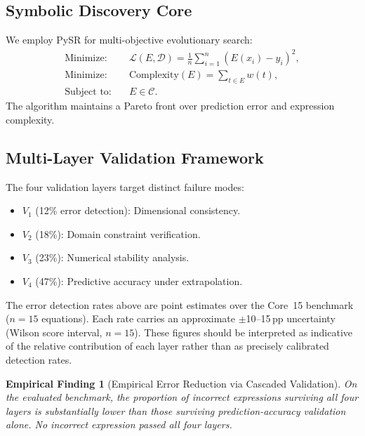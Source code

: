 \documentclass[twoside,11pt]{article}
\newtheorem{finding}{Empirical Finding}
\begin{document}
\subsection{Symbolic Discovery Core}\label{subsec:symbolic-discovery-core}
\label{sec:arch_discovery}

We employ PySR \citep{cranmer2023pysr} for multi-objective evolutionary search:
\begin{align}
\text{Minimize:} \quad
& \mathcal{L}(E,\mathcal{D})
  = \frac{1}{n}\sum_{i=1}^n (E(x_i) - y_i)^2, \label{eq:loss}\\
\text{Minimize:} \quad
& \mathrm{Complexity}(E) = \sum_{t \in E} w(t), \label{eq:complexity}\\
\text{Subject to:} \quad
& E \in \mathcal{C}. \label{eq:constraints}
\end{align}
The algorithm maintains a Pareto front over prediction error and expression
complexity.

\subsection{Multi-Layer Validation Framework}\label{subsec:multilayer-validation-framework}
\label{sec:validation_detail}

The four validation layers target distinct failure modes:

\begin{itemize}
\item $V_1$ (12\% error detection): Dimensional consistency.
\item $V_2$ (18\%): Domain constraint verification.
\item $V_3$ (23\%): Numerical stability analysis.
\item $V_4$ (47\%): Predictive accuracy under extrapolation.
\end{itemize}

\begin{remark}
\label{rem:validation_ci}
The error detection rates above are point estimates over the Core~15 benchmark
($n=15$ equations).  Each rate carries an approximate $\pm$10--15\,pp
uncertainty (Wilson score interval, $n=15$).  These figures should be
interpreted as indicative of the relative contribution of each layer rather
than as precisely calibrated detection rates.
\end{remark}

\begin{finding}[Empirical Error Reduction via Cascaded Validation]
\label{prop:validation_reduction}
On the evaluated benchmark, the proportion of incorrect expressions surviving
all four layers is substantially lower than those surviving prediction-accuracy
validation alone.  No incorrect expression passed all four layers.
\end{finding}
\end{document}
